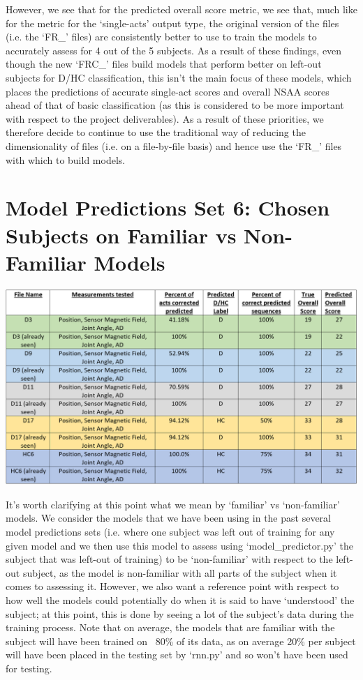 \documentclass[12pt,twoside]{report}
\begin{document}
\quad However, we see that for the predicted overall score metric, we see that, much like for the metric for the ‘single-acts’ output type, the original version of the files (i.e. the ‘FR\_’ files) are consistently better to use to train the models to accurately assess for 4 out of the 5 subjects. As a result of these findings, even though the new ‘FRC\_’ files build models that perform better on left-out subjects for D/HC classification, this isn’t the main focus of these models, which places the predictions of accurate single-act scores and overall NSAA scores ahead of that of basic classification (as this is considered to be more important with respect to the project deliverables). As a result of these priorities, we therefore decide to continue to use the traditional way of reducing the dimensionality of files (i.e. on a file-by-file basis) and hence use the ‘FR\_’ files with which to build models.



\section{Model Predictions Set 6: Chosen Subjects on Familiar vs Non-Familiar Models}

\begin{center}
\includegraphics[scale=0.4]{project_figures/fig11_8}
\end{center}

\quad It’s worth clarifying at this point what we mean by ‘familiar’ vs ‘non-familiar’ models. We consider the models that we have been using in the past several model predictions sets (i.e. where one subject was left out of training for any given model and we then use this model to assess using ‘model\_predictor.py’ the subject that was left-out of training) to be ‘non-familiar’ with respect to the left-out subject, as the model is non-familiar with all parts of the subject when it comes to assessing it. However, we also want a reference point with respect to how well the models could potentially do when it is said to have ‘understood’ the subject; at this point, this is done by seeing a lot of the subject’s data during the training process. Note that on average, the models that are familiar with the subject will have been trained on ~80\% of its data, as on average 20\% per subject will have been placed in the testing set by ‘rnn.py’ and so won’t have been used for testing.\\
\end{document}
